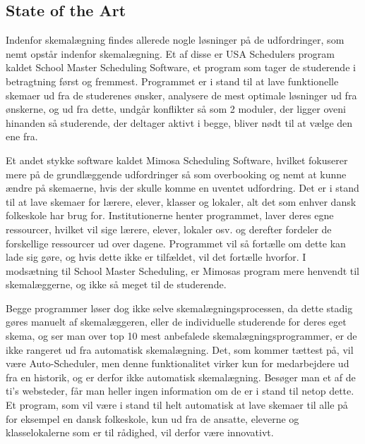 \subsection{State of the Art}
Indenfor skemalægning findes allerede nogle løsninger på de udfordringer, som nemt opstår indenfor skemalægning. Et af disse er USA Schedulers program kaldet School Master Scheduling Software\cite{USAS}, et program som tager de studerende i betragtning først og fremmest. Programmet er i stand til at lave funktionelle skemaer ud fra de studerenes ønsker, analysere de mest optimale løsninger ud fra ønskerne, og ud fra dette, undgår konflikter så som 2 moduler, der ligger oveni hinanden så studerende, der deltager aktivt i begge, bliver nødt til at vælge den ene fra.

Et andet stykke software kaldet Mimosa Scheduling Software\cite{Mimosa}, hvilket fokuserer mere på de grundlæggende udfordringer så som overbooking og nemt at kunne ændre på skemaerne, hvis der skulle komme en uventet udfordring. Det er i stand til at lave skemaer for lærere, elever, klasser og lokaler, alt det som enhver dansk folkeskole har brug for. Institutionerne henter programmet, laver deres egne ressourcer, hvilket vil sige lærere, elever, lokaler osv. og derefter fordeler de forskellige ressourcer ud over dagene. Programmet vil så fortælle om dette kan lade sig gøre, og hvis dette ikke er tilfældet, vil det fortælle hvorfor\cite{MimosaTutorial}. I modsætning til School Master Scheduling, er Mimosas program mere henvendt til skemalæggerne, og ikke så meget til de studerende. 

Begge programmer løser dog ikke selve skemalægningsprocessen, da dette stadig gøres manuelt af skemalæggeren, eller de individuelle studerende for deres eget skema, og ser man over top 10 mest anbefalede skemalægningsprogrammer\cite{top10Schedulers}, er de ikke rangeret ud fra automatisk skemalægning. Det, som kommer tættest på, vil være Auto-Scheduler, men denne funktionalitet virker kun for medarbejdere ud fra en historik, og er derfor ikke automatisk skemalægning. Besøger man et af de ti's websteder, får man heller ingen information om de er i stand til netop dette. Et program, som vil være i stand til helt automatisk at lave skemaer til alle på for eksempel en dansk folkeskole, kun ud fra de ansatte, eleverne og klasselokalerne som er til rådighed, vil derfor være innovativt.
